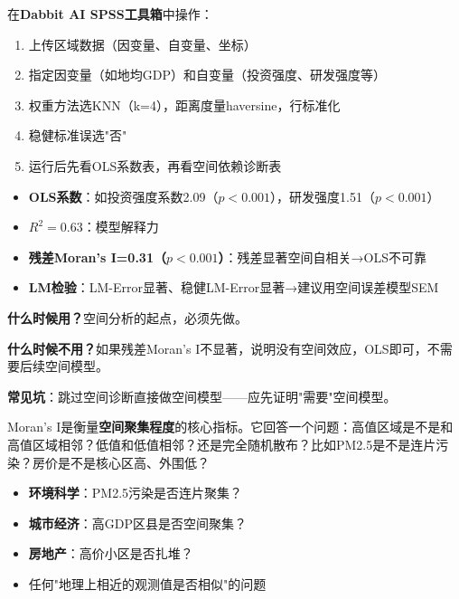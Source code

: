 \begin{algosposs}
在\textbf{Dabbit AI SPSS工具箱}中操作：

\begin{enumerate}
    \item 上传区域数据（因变量、自变量、坐标）
    \item 指定因变量（如地均GDP）和自变量（投资强度、研发强度等）
    \item 权重方法选KNN（k=4），距离度量haversine，行标准化
    \item 稳健标准误选"否"
    \item 运行后先看OLS系数表，再看空间依赖诊断表
\end{enumerate}
\end{algosposs}

\begin{algoresult}
\begin{itemize}
    \item \textbf{OLS系数}：如投资强度系数2.09（$p<0.001$），研发强度1.51（$p<0.001$）
    \item \textbf{$R^2=0.63$}：模型解释力
    \item \textbf{残差Moran's I=0.31（$p<0.001$）}：残差显著空间自相关→OLS不可靠
    \item \textbf{LM检验}：LM-Error显著、稳健LM-Error显著→建议用空间误差模型SEM
\end{itemize}
\end{algoresult}

\begin{algonotes}
\textbf{什么时候用？}空间分析的起点，必须先做。

\textbf{什么时候不用？}如果残差Moran's I不显著，说明没有空间效应，OLS即可，不需要后续空间模型。

\textbf{常见坑}：跳过空间诊断直接做空间模型——应先证明"需要"空间模型。
\end{algonotes}


\begin{algointro}
Moran's I是衡量\textbf{空间聚集程度}的核心指标。它回答一个问题：高值区域是不是和高值区域相邻？低值和低值相邻？还是完全随机散布？比如PM2.5是不是连片污染？房价是不是核心区高、外围低？
\end{algointro}

\begin{algoscene}
\begin{itemize}
    \item \textbf{环境科学}：PM2.5污染是否连片聚集？
    \item \textbf{城市经济}：高GDP区县是否空间聚集？
    \item \textbf{房地产}：高价小区是否扎堆？
    \item 任何"地理上相近的观测值是否相似"的问题
\end{itemize}
\end{algoscene}

